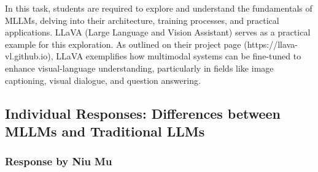 \documentclass[12pt,a4paper]{article}
\begin{document}
In this task, students are required to explore and understand the fundamentals of MLLMs, delving into their architecture, training processes, and practical applications. LLaVA (Large Language and Vision Assistant) serves as a practical example for this exploration. As outlined on their project page (https://llava-vl.github.io), LLaVA exemplifies how multimodal systems can be fine-tuned to enhance visual-language understanding, particularly in fields like image captioning, visual dialogue, and question answering.

\subsection{Individual Responses: Differences between MLLMs and Traditional LLMs}

\subsubsection{Response by Niu Mu}
\end{document}
